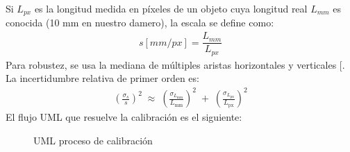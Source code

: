 \documentclass[a4paper,10pt,spanish]{jupyterBook}
\begin{document}
\sphinxAtStartPar
Si \(𝐿_{px}\) es la longitud medida en píxeles de un objeto cuya longitud real \(L_{mm}\) es conocida (10 mm en nuestro damero), la escala se define como:
\begin{equation*}
\begin{split}
𝑠[mm/px]=\dfrac{L_{mm}}{𝐿_{px}}
\end{split}
\end{equation*}
\sphinxAtStartPar
Para robustez, se usa la mediana de múltiples aristas horizontales y verticales {[}\sphinxhref{https://doi.org/10.1109/34.888718}{Zang, Z., 2020}{]}. La incertidumbre relativa de primer orden es:
\begin{equation}\label{equation:content/01/Modulo-2:incertidumbre_calibracion}
\begin{split}\left(\frac{\sigma_s}{s}\right)^2 \;\approx\;
\left(\frac{\sigma_{L_{\text{mm}}}}{L_{\text{mm}}}\right)^2 \;+\;
\left(\frac{\sigma_{L_{\text{px}}}}{L_{\text{px}}}\right)^2\end{split}
\end{equation}
\sphinxAtStartPar
El flujo UML que resuelve la calibración es el siguiente:

\begin{figure}[htbp]
\centering
\capstart

\noindent{}
\caption{UML proceso de calibración}\label{\detokenize{content/01/Modulo-2:figura-wp1-imagen-5}}\end{figure}
\end{document}
